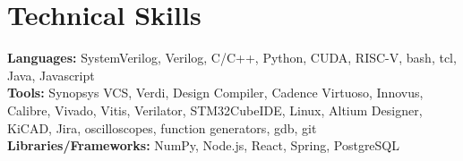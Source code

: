 \documentclass[letterpaper,11pt]{article}
\begin{document}
\section{Technical Skills}
 \begin{itemize}[leftmargin=0.15in, label={}]
    \small{\item{
     \textbf{Languages:} SystemVerilog, Verilog, C/C++, Python, CUDA, RISC-V, bash, tcl, Java, Javascript \\
     \textbf{Tools:} Synopsys VCS, Verdi, Design Compiler, Cadence Virtuoso, Innovus, Calibre, Vivado, Vitis, Verilator, STM32CubeIDE, Linux, Altium Designer, KiCAD, Jira, oscilloscopes, function generators, gdb, git \\
     \textbf{Libraries/Frameworks:} NumPy, Node.js, React, Spring, PostgreSQL
     }}
 \end{itemize}

\end{document}
